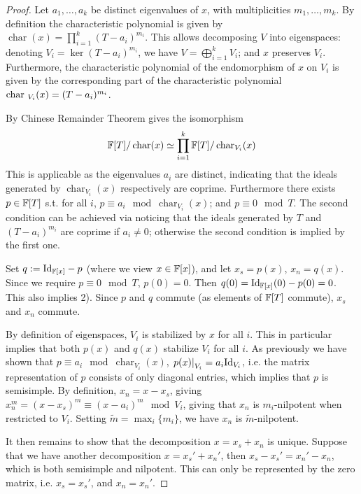 \documentclass{article}
\begin{document}
\begin{proof}
    Let $a_1, \dots, a_k$ be distinct eigenvalues of $x$, with multiplicities $m_1, \dots, m_k$. By definition the characteristic polynomial is given by $\operatorname{char}(x) = \prod_{i = 1}^k (T - a_i)^{m_i}$. This allows decomposing $V$ into eigenspaces: denoting $V_i = \ker (T - a_i)^{m_i}$, we have $V = \bigoplus_{i = 1}^k V_i$; and $x$ preserves $V_i$. Furthermore, the characteristic polynomial of the endomorphism of $x$ on $V_i$ is given by the corresponding part of the characteristic polynomial $\mathrm{char}\ _{V_i}(x) = (T - a_i)^{m_i}$.

    By Chinese Remainder Theorem gives the isomorphism
    \[
        \mathbb{F}[T]/\operatorname{char}(x) \simeq \prod_{i = 1}^k \mathbb{F}[T]/\operatorname{char}_{V_i}(x)
    \]
    This is applicable as the eigenvalues $a_i$ are distinct, indicating that the ideals generated by $\operatorname{char}_{V_i}(x)$ respectively are coprime. Furthermore there exists $p \in \mathbb{F}[T]$ s.t. for all $i$, $p \equiv a_i \mod{\operatorname{char}_{V_i}(x)}$; and $p \equiv 0 \mod{T}$. The second condition can be achieved via noticing that the ideals generated by $T$ and $(T - a_i)^{m_i}$ are coprime if $a_i \neq 0$; otherwise the second condition is implied by the first one. 

    Set $q := \mathrm{Id}_{\mathbb{F}[x]} - p$ (where we view $x \in \mathbb{F}[x]$), and let $x_s = p(x)$, $x_n = q(x)$. Since we require $p \equiv 0 \mod{T}$, $p(0) = 0$. Then $q(0) = \mathrm{Id}_{\mathbb{F}[x]}(0) - p(0) = 0$. This also implies 2). Since $p$ and $q$ commute (as elements of $\mathbb{F}[T]$ commute), $x_s$ and $x_n$ commute. 
    
    By definition of eigenspaces, $V_i$ is stabilized by $x$ for all $i$. This in particular implies that both $p(x)$ and $q(x)$ stabilize $V_i$ for all $i$. As previously we have shown that $p \equiv a_i \mod{\operatorname{char}_{V_i}(x)}$, $\left.p(x)\right|_{V_i} = a_i \mathrm{Id}_{V_i}$, i.e. the matrix representation of $p$ consists of only diagonal entries, which implies that $p$ is semisimple. By definition, $x_n = x - x_s$, giving $x_n^m = (x - x_s)^m \equiv (x - a_i)^m \mod{V_i}$, giving that $x_n$ is $m_i$-nilpotent when restricted to $V_i$. Setting $\widetilde{m} = \max_i \{ m_i \}$, we have $x_n$ is $\widetilde{m}$-nilpotent. 

    It then remains to show that the decomposition $x = x_s + x_n$ is unique. Suppose that we have another decomposition $x = x_s' + x_n'$, then $x_s - x_s' = x_n' - x_n$, which is both semisimple and nilpotent. This can only be represented by the zero matrix, i.e. $x_s = x_s'$, and $x_n = x_n'$.
\end{proof}
\end{document}
